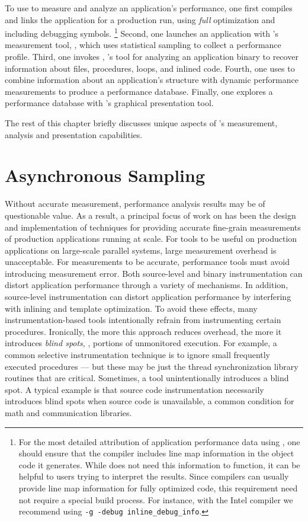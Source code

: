 \documentclass[11pt,letterpaper]{report}
\begin{document}
To use \HPCToolkit{} to measure and analyze an application's performance, one first compiles and links the application for a production run, using \emph{full} optimization and including debugging symbols.%
\footnote{%
For the most detailed attribution of application performance data using \HPCToolkit{}, one should ensure that the compiler includes line map information in the object code it generates. While \HPCToolkit{} does not need this information to function, it can be helpful to users trying to interpret the results. Since compilers can usually provide line map information for fully optimized code, this requirement need not require a special build process. For instance, with the Intel compiler we recommend using \texttt{-g -debug inline\_debug\_info}.}
Second, one launches an application with \HPCToolkit{}'s measurement tool, \hpcrun{}, which uses statistical sampling to collect a performance profile.
Third, one invokes \hpcstruct{}, \HPCToolkit{}'s tool for analyzing an application binary to recover information about files, procedures, loops, and inlined code.
Fourth, one uses \hpcprof{} to combine information about an application's structure with dynamic performance measurements to produce a performance database.
Finally, one explores a performance database with \HPCToolkit{}'s \hpcviewer{} graphical presentation tool.

The rest of this chapter briefly discusses unique aspects of \HPCToolkit{}'s measurement, analysis and presentation capabilities.


\section{Asynchronous Sampling}

Without accurate measurement, performance analysis results may be of questionable value.
As a result, a principal focus of work on \HPCToolkit{} has been the design and implementation of techniques for providing accurate fine-grain measurements of production applications running at scale.
For tools to be useful on production applications on large-scale parallel systems, large measurement overhead is unacceptable.
For measurements to be accurate, performance tools must avoid introducing measurement error.
Both source-level and binary instrumentation can distort application performance through a variety of mechanisms. %
In addition, source-level instrumentation can distort application performance by interfering with inlining and template optimization.
To avoid these effects, many instrumentation-based tools intentionally refrain from instrumenting certain procedures.
Ironically, the more this approach reduces overhead, the more it introduces \emph{blind spots}, \ie{}, portions of unmonitored execution.
For example, a common selective instrumentation technique is to ignore small frequently executed procedures --- but these may be just the thread synchronization library routines that are critical.
Sometimes, a tool unintentionally introduces a blind spot.
A typical example is that source code instrumentation necessarily introduces blind spots when source code is unavailable, a common condition for math and communication libraries.
\end{document}

